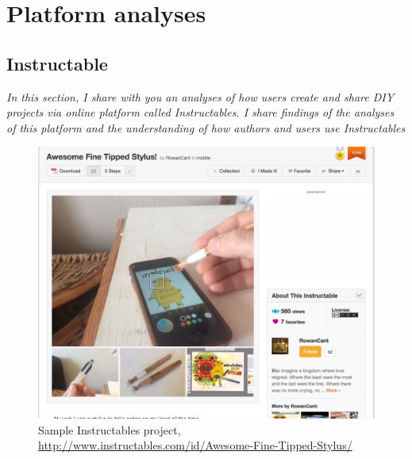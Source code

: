 \chapter{Platform analyses} 


\section{Instructable}


\begin{center}
	\begin{minipage}{.7\textwidth}
		\textit{In this section, I share with you an analyses of how users create and share \textit{DIY} projects via online platform called Instructables. I share findings of the analyses of this platform and the understanding of how authors and users use Instructables}
	\end{minipage}
\end{center}

\begin{figure}[ht!]
	\includegraphics[scale=0.36]{./images/img-instructables.png}
	\caption{Sample Instructables project, \url{http://www.instructables.com/id/Awesome-Fine-Tipped-Stylus/}}
	\label{sec:img-instructables}
\end{figure}

